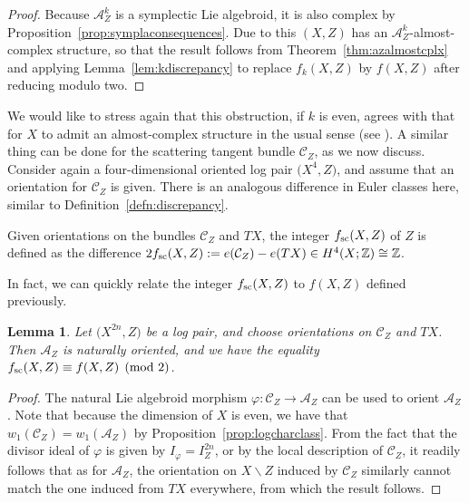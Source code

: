 \documentclass[pdftex]{sigma}
\numberwithin{equation}{section}
\newtheorem{Lemma}[Theorem]{Lemma}
\begin{document}
\begin{proof} Because $\mathcal{A}_Z^k$ is a symplectic Lie algebroid, it is also complex by Proposition~\ref{prop:symplaconsequences}. Due to this $(X,Z)$ has an $\mathcal{A}_Z^k$-almost-complex structure, so that the result follows from Theorem~\ref{thm:azalmostcplx} and applying Lemma~\ref{lem:kdiscrepancy} to replace $f_k(X,Z)$ by $f(X,Z)$ after reducing modulo two.
\end{proof}

We would like to stress again that this obstruction, if $k$ is even, agrees with that for $X$ to admit an almost-complex structure in the usual sense (see \cite[Theorem~1.4.13]{GompfStipsicz99}).
A similar thing can be done for the scattering tangent bundle $\mathcal{C}_Z$, as we now discuss. Consider again a four-dimensional oriented log pair $\big(X^4, Z\big)$, and assume that an orientation for $\mathcal{C}_Z$ is given. There is an analogous difference in Euler classes here, similar to Definition~\ref{defn:discrepancy}.

\begin{Definition} Given orientations on the bundles $\mathcal{C}_Z$ and $TX$, the integer $f_{\rm sc}(X,Z)$ of $Z$ is defined as the difference $2 f_{\rm sc}(X,Z) := e(\mathcal{C}_Z) - e(TX) \in H^4(X;\mathbb{Z}) \cong \mathbb{Z}$.
\end{Definition}

In fact, we can quickly relate the integer $f_{\rm sc}(X,Z)$ to $f(X,Z)$ defined previously.

\begin{Lemma}\label{lem:scdiscrepancy} Let $\big(X^{2n}, Z\big)$ be a log pair, and choose orientations on $\mathcal{C}_Z$ and $TX$. Then $\mathcal{A}_Z$ is naturally oriented, and we have the equality $f_{\rm sc}(X,Z) \equiv f(X,Z) \pmod{2}$.
\end{Lemma}

\begin{proof} The natural Lie algebroid morphism $\varphi\colon \mathcal{C}_Z \to \mathcal{A}_Z$ can be used to orient $\mathcal{A}_Z$. Note that because the dimension of $X$ is even, we have that $w_1(\mathcal{C}_Z) = w_1(\mathcal{A}_Z)$ by Proposition~\ref{prop:logcharclass}. From the fact that the divisor ideal of $\varphi$ is given by $I_\varphi = I_Z^{2n}$, or by the local description of $\mathcal{C}_Z$, it readily follows that as for $\mathcal{A}_Z$, the orientation on $X\backslash Z$ induced by $\mathcal{C}_Z$ similarly cannot match the one induced from $TX$ everywhere, from which the result follows.
\end{proof}
\end{document}
